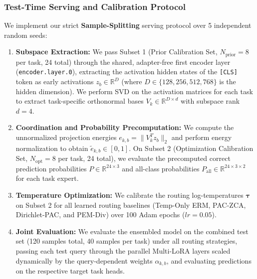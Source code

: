\subsubsection{Test-Time Serving and Calibration Protocol}
We implement our strict \textbf{Sample-Splitting} serving protocol over 5 independent random seeds:
\begin{enumerate}
    \item \textbf{Subspace Extraction:} We pass Subset 1 (Prior Calibration Set, $N_{\text{prior}} = 8$ per task, 24 total) through the shared, adapter-free first encoder layer (\texttt{encoder.layer.0}), extracting the activation hidden states of the \texttt{[CLS]} token as early activations $z_b \in \mathbb{R}^D$ (where $D \in \{128, 256, 512, 768\}$ is the hidden dimension). We perform SVD on the activation matrices for each task to extract task-specific orthonormal bases $V_k \in \mathbb{R}^{D \times d}$ with subspace rank $d=4$.
    \item \textbf{Coordination and Probability Precomputation:} We compute the unnormalized projection energies $e_{k, b} = \|V_k^T z_b\|_2$ and perform energy normalization to obtain $\tilde{e}_{k, b} \in [0, 1]$. On Subset 2 (Optimization Calibration Set, $N_{\text{opt}} = 8$ per task, 24 total), we evaluate the precomputed correct prediction probabilities $P \in \mathbb{R}^{24 \times 3}$ and all-class probabilities $P_{\text{all}} \in \mathbb{R}^{24 \times 3 \times 2}$ for each task expert.
    \item \textbf{Temperature Optimization:} We calibrate the routing log-temperatures $\boldsymbol{\tau}$ on Subset 2 for all learned routing baselines (Temp-Only ERM, PAC-ZCA, Dirichlet-PAC, and PEM-Div) over 100 Adam epochs ($lr=0.05$).
    \item \textbf{Joint Evaluation:} We evaluate the ensembled model on the combined test set (120 samples total, 40 samples per task) under all routing strategies, passing each test query through the parallel Multi-LoRA layers scaled dynamically by the query-dependent weights $\alpha_{k, b}$, and evaluating predictions on the respective target task heads.
\end{enumerate}

